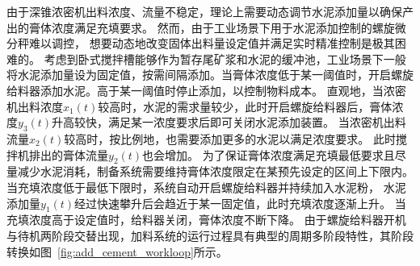 由于深锥浓密机出料浓度、流量不稳定，理论上需要动态调节水泥添加量以确保产出的膏体浓度满足充填要求。
然而，由于工业场景下用于水泥添加控制的螺旋微分秤难以调控，
想要动态地改变固体出料量设定值并满足实时精准控制是极其困难的。
考虑到卧式搅拌槽能够作为暂存尾矿浆和水泥的缓冲池，工业场景下一般将水泥添加量设为固定值，按需间隔添加。当膏体浓度低于某一阈值时，开启螺旋给料器添加水泥。高于某一阈值时停止添加，以控制物料成本。
直观地，当浓密机出料浓度$x_1(t)$较高时，水泥的需求量较少，此时开启螺旋给料器后，膏体浓度$y_3(t)$升高较快，满足某一浓度要求后即可关闭水泥添加装置。
当浓密机出料流量$x_2(t)$较高时，按比例地，也需要添加更多的水泥以满足浓度要求。
此时搅拌机排出的膏体流量$y_2(t)$也会增加。
为了保证膏体浓度满足充填最低要求且尽量减少水泥消耗，制备系统需要维持膏体浓度限定在某预先设定的区间上下限内。
当充填浓度低于最低下限时，系统自动开启螺旋给料器并持续加入水泥粉，
水泥添加量$y_1(t)$经过快速攀升后会趋近于某一固定值，此时充填浓度逐渐上升。
当充填浓度高于设定值时，给料器关闭，膏体浓度不断下降。
由于螺旋给料器开机与待机两阶段交替出现，加料系统的运行过程具有典型的周期多阶段特性，其阶段转换如图~\ref{fig:add_cement_workloop}所示。 


